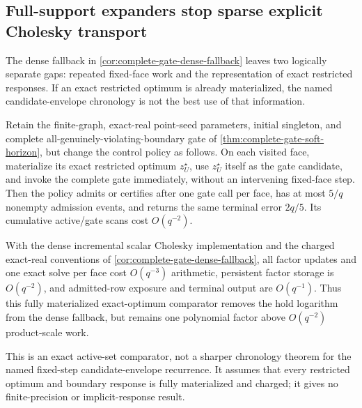 \subsection{Full-support expanders stop sparse explicit Cholesky transport}
\label{sec:explicit-cholesky-expander-stop}

The dense fallback in \cref{cor:complete-gate-dense-fallback} leaves two
logically separate gaps: repeated fixed-face work and the representation of
exact restricted responses.  If an exact restricted optimum is already
materialized, the named candidate-envelope chronology is not the best use of
that information.

\begin{corollary}
\label{cor:complete-gate-exact-optimum-comparator}
Retain the finite-graph, exact-real point-seed parameters, initial singleton,
and complete all-genuinely-violating-boundary gate of
\cref{thm:complete-gate-soft-horizon}, but change the control policy as
follows.  On each visited face, materialize its exact restricted optimum
$z_U^\star$, use $z_U^\star$ itself as the gate candidate, and invoke the
complete gate immediately, without an intervening fixed-face step.  Then the
policy admits or certifies after one gate call per face, has at most $5/q$
nonempty admission events, and returns the same terminal error
$2q/5$.  Its cumulative active/gate scans cost $O(q^{-2})$.

With the dense incremental scalar Cholesky implementation and the charged
exact-real conventions of \cref{cor:complete-gate-dense-fallback}, all factor
updates and one exact solve per face cost $O(q^{-3})$ arithmetic, persistent
factor storage is $O(q^{-2})$, and admitted-row exposure and terminal output
are $O(q^{-1})$.  Thus this fully materialized exact-optimum comparator removes
the hold logarithm from the dense fallback, but remains one polynomial factor
above $O(q^{-2})$ product-scale work.

This is an exact active-set comparator, not a sharper chronology theorem for
the named fixed-step candidate-envelope recurrence.  It assumes that every
restricted optimum and boundary response is fully materialized and charged;
it gives no finite-precision or implicit-response result.
\end{corollary}

